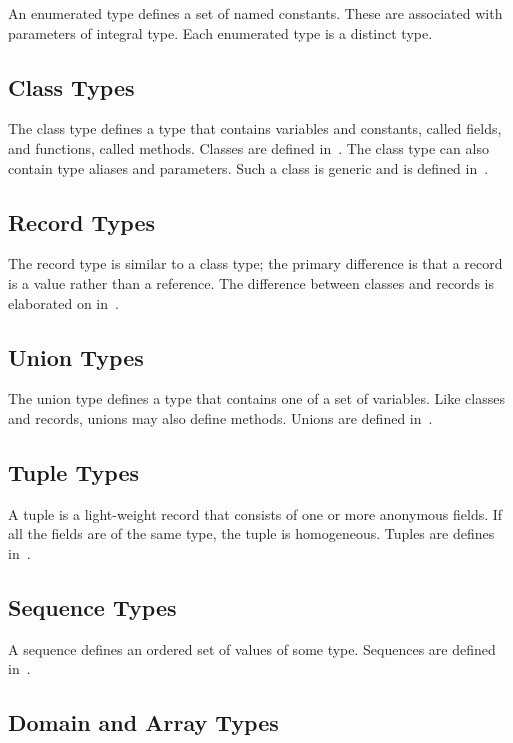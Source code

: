 An enumerated type defines a set of named constants.  These are
associated with parameters of integral type.  Each enumerated type is
a distinct type.

\subsection{Class Types}
\label{Class_Types}

The class type defines a type that contains variables and constants,
called fields, and functions, called methods.  Classes are defined
in~.  The class type can also contain type aliases and
parameters.  Such a class is generic and is defined
in~.

\subsection{Record Types}
\label{Record_Types}

The record type is similar to a class type; the primary difference is
that a record is a value rather than a reference.  The difference
between classes and records is elaborated on in~.

\subsection{Union Types}
\label{Union_Types}

The union type defines a type that contains one of a set of variables.
Like classes and records, unions may also define methods.  Unions are
defined in~.

\subsection{Tuple Types}
\label{Tuple_Types}

A tuple is a light-weight record that consists of one or more
anonymous fields.  If all the fields are of the same type, the tuple
is homogeneous.  Tuples are defines in~.

\subsection{Sequence Types}
\label{Sequence_Types}

A sequence defines an ordered set of values of some type.  Sequences
are defined in~.

\subsection{Domain and Array Types}
\label{Domain_and_Array_Types}

